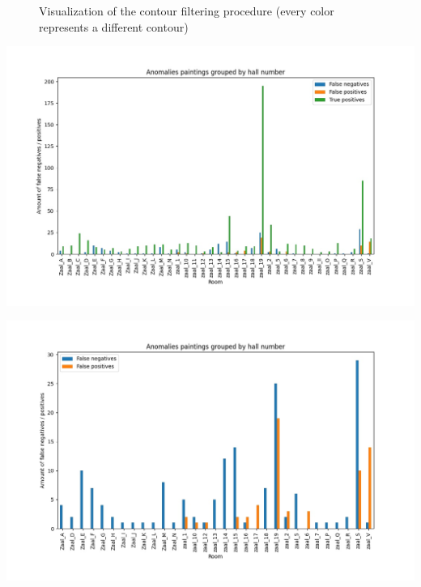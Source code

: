\begin{figure}[htbp]
{        \label{fig:contours_on_image}
    }
    \caption{Visualization of the contour filtering procedure (every color represents a different contour)}
    \label{fig:contours}
\end{figure}

\clearpage
\begin{strip}
    \centering
    \includegraphics[width=\linewidth]{images/grouped_by_hall_include_TP.jpg}
    \label{fig:benchmark-all}
\end{strip}

\begin{strip}
    \centering
    \includegraphics[width=\linewidth]{images/grouped_by_hall.jpg}
    \label{fig:benchmark-notp}
   
\end{strip}

